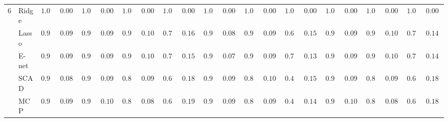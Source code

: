 \begin{tabular}{p{0.2cm}p{1cm}|p{0.6cm}p{0.6cm}|p{0.6cm}p{0.6cm}p{0.6cm}p{0.6cm}p{0.6cm}p{0.6cm}|p{0.6cm}p{0.6cm}p{0.6cm}p{0.6cm}p{0.6cm}p{0.6cm}|p{0.6cm}p{0.6cm}p{0.6cm}p{0.6cm}p{0.6cm}p{0.6cm}}
6 & Ridge  & $1.000$ & $0.0000$ & $1.000$ & $0.0000$ & $1.000$ & $0.0000$ & $1.000$ & $0.0000$ & $1.000$ & $0.0000$ & $1.000$ & $0.0000$ & $1.000$ & $0.0000$ & $1.000$ & $0.0000$ & $1.000$ & $0.0000$ & $1.000$ & $0.0000$ \\
 & Lasso  & $0.936$ & $0.0938$ & $0.926$ & $0.0970$ & $0.906$ & $0.1003$ & $0.736$ & $0.1630$ & $0.956$ & $0.0833$ & $0.954$ & $0.0979$ & $0.622$ & $0.1580$ & $0.934$ & $0.0945$ & $0.914$ & $0.1073$ & $0.716$ & $0.1454$ \\
 & E-net  & $0.938$ & $0.0930$ & $0.922$ & $0.0980$ & $0.908$ & $0.1002$ & $0.746$ & $0.1527$ & $0.964$ & $0.0772$ & $0.960$ & $0.0943$ & $0.710$ & $0.1374$ & $0.932$ & $0.0952$ & $0.920$ & $0.1064$ & $0.738$ & $0.1469$ \\
 & SCAD  & $0.948$ & $0.0882$ & $0.934$ & $0.0945$ & $0.876$ & $0.0976$ & $0.630$ & $0.1894$ & $0.940$ & $0.0921$ & $0.896$ & $0.1004$ & $0.498$ & $0.1544$ & $0.930$ & $0.0959$ & $0.868$ & $0.0952$ & $0.624$ & $0.1892$ \\
 & MCP  & $0.934$ & $0.0945$ & $0.908$ & $0.1002$ & $0.850$ & $0.0870$ & $0.616$ & $0.1963$ & $0.932$ & $0.0952$ & $0.872$ & $0.0965$ & $0.478$ & $0.1474$ & $0.900$ & $0.1005$ & $0.842$ & $0.0819$ & $0.630$ & $0.1894$ \\
\hline 
\end{tabular}

